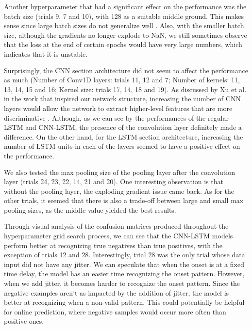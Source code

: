 \documentclass[format=sigconf, nonacm=true, review=false, screen=true]{acmart}
\begin{document}
Another hyperparameter that had a significant effect on the performance was the batch size (trials 9, 7 and 10), with 128 as a suitable middle ground. This makes sense since large batch sizes do not generalize well \cite{KeskarMNST16}. Also, with the smaller batch size, although the gradients no longer explode to NaN, we still sometimes observe that the loss at the end of certain epochs would have very large numbers, which indicates that it is unstable.

Surprisingly, the CNN section architecture did not seem to affect the performance as much (Number of Conv1D layers: trials 11, 12 and 7; Number of kernels: 11, 13, 14, 15 and 16; Kernel size: trials 17, 14, 18 and 19). As discussed by Xu et al. in the work that inspired our network structure, increasing the number of CNN layers would allow the network to extract higher-level features that are more discriminative \cite{xu2020seizure}. Although, as we can see by the performances of the regular LSTM and CNN-LSTM, the presence of the convolution layer definitely made a difference.
On the other hand, for the LSTM section architecture, increasing the number of LSTM units in each of the layers seemed to have a positive effect on the performance.

We also tested the max pooling size of the pooling layer after the convolution layer (trials 24, 23, 22, 14, 21 and 20). One interesting observation is that without the pooling layer, the exploding gradient issue came back. As for the other trials, it seemed that there is also a trade-off between large and small max pooling sizes, as the middle value yielded the best results.

Through visual analysis of the confusion matrices produced throughout the hyperparameter grid search process, we can see that the CNN-LSTM models perform better at recognizing true negatives than true positives, with the exception of trials 12 and 28. Interestingly, trial 28 was the only trial whose data input did not have any jitter. We can speculate that when the onset is at a fixed time delay, the model has an easier time recognizing the onset pattern. However, when we add jitter, it becomes harder to recognize the onset pattern. Since the negative examples aren't as impacted by the addition of jitter, the model is better at recognizing when a non-valid pattern. This could potentially be helpful for online prediction, where negative samples would occur more often than positive ones.
\end{document}
